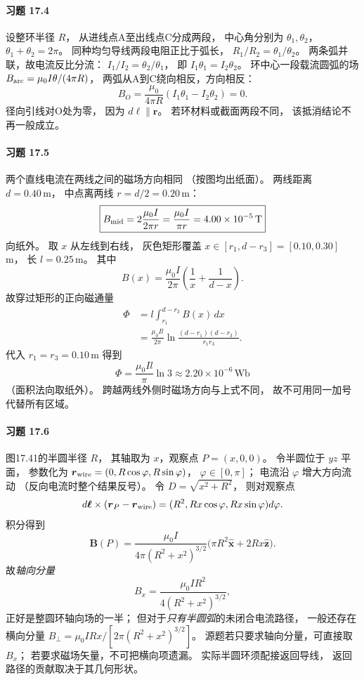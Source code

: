 \paragraph{习题 17.4}
设整环半径 \(R\)，
从进线点A至出线点C分成两段，
中心角分别为
\(\theta_1,\theta_2\)，
\(\theta_1+\theta_2=2\pi\)。
同种均匀导线两段电阻正比于弧长，
\(R_1/R_2=\theta_1/\theta_2\)。
两条弧并联，故电流反比分流：
\(I_1/I_2=\theta_2/\theta_1\)，
即
\(I_1\theta_1=I_2\theta_2\)。
环中心一段载流圆弧的场
\(B_{\rm arc}=\mu_0 I\theta/(4\pi R)\)，
两弧从A到C绕向相反，方向相反：
\[
 \boxed{B_O=\frac{\mu_0}{4\pi R}
 (I_1\theta_1-I_2\theta_2)=0}.
\]
径向引线对O处为零，
因为 \(d\boldsymbol\ell\parallel\boldsymbol r\)。
若环材料或截面两段不同，
该抵消结论不再一般成立。

\paragraph{习题 17.5}
两个直线电流在两线之间的磁场方向相同
（按图均出纸面）。
两线距离 \(d=0.40\,\mathrm m\)，
中点离两线 \(r=d/2=0.20\,\mathrm m\)：
\[
 \boxed{B_{\rm mid}
 =2\frac{\mu_0I}{2\pi r}
 =\frac{\mu_0I}{\pi r}
 =4.00\times10^{-5}\,\mathrm T}
\]
向纸外。
取 \(x\) 从左线到右线，
灰色矩形覆盖
\(x\in[r_1,d-r_3]=[0.10,0.30]\) m，
长 \(l=0.25\,\mathrm m\)。
其中
\[
 B(x)=\frac{\mu_0I}{2\pi}
 \left(\frac1x+\frac1{d-x}\right).
\]
故穿过矩形的正向磁通量
\[
 \begin{aligned}
 \Phi&=l\int_{r_1}^{d-r_3}B(x)\,dx\\
 &=\frac{\mu_0Il}{2\pi}
 \ln\frac{(d-r_1)(d-r_3)}{r_1r_3}.
 \end{aligned}
\]
代入 \(r_1=r_3=0.10\,\mathrm m\)
得到
\[
 \boxed{\Phi=\frac{\mu_0Il}{\pi}\ln3
 \approx2.20\times10^{-6}\,\mathrm{Wb}}
\]
（面积法向取纸外）。
跨越两线外侧时磁场方向与上式不同，
故不可用同一加号代替所有区域。

\paragraph{习题 17.6}
图17.41的半圆半径 \(R\)，
其轴取为 \(x\)，观察点
\(P=(x,0,0)\)。
令半圆位于 \(yz\) 平面，
参数化为
\(\boldsymbol r_{\rm wire}
 =(0,R\cos\varphi,R\sin\varphi)\)，
\(\varphi\in[0,\pi]\)；
电流沿 \(\varphi\) 增大方向流动
（反向电流时整个结果反号）。
令
\(D=\sqrt{x^2+R^2}\)，
则对观察点
\[
 d\boldsymbol\ell\times
 (\boldsymbol r_P-\boldsymbol r_{\rm wire})
 =(R^2,Rx\cos\varphi,Rx\sin\varphi)d\varphi.
\]
积分得到
\[
 \boxed{\boldsymbol B(P)=
 \frac{\mu_0I}{4\pi(R^2+x^2)^{3/2}}
 \big(\pi R^2\hat{\boldsymbol x}
 +2Rx\hat{\boldsymbol z}\big)}.
\]
故\emph{轴向分量}
\[
 \boxed{B_x=\frac{\mu_0IR^2}
 {4(R^2+x^2)^{3/2}}},
\]
正好是整圆环轴向场的一半；
但对于\emph{只有半圆弧}的未闭合电流路径，
一般还存在横向分量
\(\boxed{B_\perp=\mu_0IRx/
 [2\pi(R^2+x^2)^{3/2}]}\)。
源题若只要求轴向分量，可直接取 \(B_x\)；
若要求磁场矢量，不可把横向项遗漏。
实际半圆环须配接返回导线，
返回路径的贡献取决于其几何形状。

